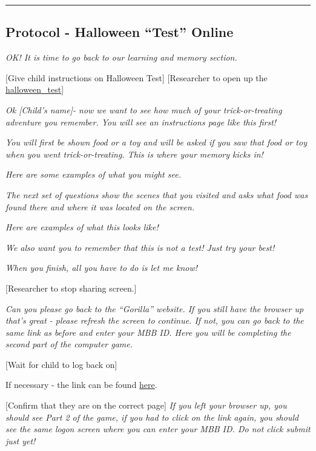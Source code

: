 \documentclass[]{book}
\begin{document}
\begin{center}\rule{0.5\linewidth}{0.5pt}\end{center}

\hypertarget{protocol---halloween-test-online-1}{%
\subsection{Protocol - Halloween ``Test'' Online}\label{protocol---halloween-test-online-1}}

\emph{OK! It is time to go back to our learning and memory section.}

{[}Give child instructions on Halloween Test{]} {[}Researcher to open up the \href{https://ucla.app.box.com/file/709479264913}{halloween\_test}{]}

\emph{Ok {[}Child's name{]}- now we want to see how much of your trick-or-treating adventure you remember. You will see an instructions page like this first!}

\emph{You will first be shown food or a toy and will be asked if you saw that food or toy when you went trick-or-treating. This is where your memory kicks in!}

\emph{Here are some examples of what you might see.}

\emph{The next set of questions show the scenes that you visited and asks what food was found there and where it was located on the screen.}

\emph{Here are examples of what this looks like!}

\emph{We also want you to remember that this is not a test! Just try your best!}

\emph{When you finish, all you have to do is let me know!}

{[}Researcher to stop sharing screen.{]}

\emph{Can you please go back to the ``Gorilla'' website. If you still have the browser up that's great - please refresh the screen to continue. If not, you can go back to the same link as before and enter your MBB ID. Here you will be completing the second part of the computer game.}

{[}Wait for child to log back on{]}

If necessary - the link can be found \href{https://research.sc/participant/login/20451/publicid}{here}.

{[}Confirm that they are on the correct page{]} \emph{If you left your browser up, you should see Part 2 of the game, if you had to click on the link again, you should see the same logon screen where you can enter your MBB ID. Do not click submit just yet!}
\end{document}
